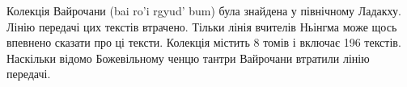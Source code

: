 Колекція Вайрочани (bai ro'i rgyud' bum) була знайдена у північному Ладакху.
Лінію передачі цих текстів втрачено. Тільки лінія вчителів Ньінгма може щось
впевнено сказати про ці тексти. Колекція містить 8 томів і включає 196 текстів.
Наскільки відомо Божевільному ченцю тантри Вайрочани втратили лінію передачі.
